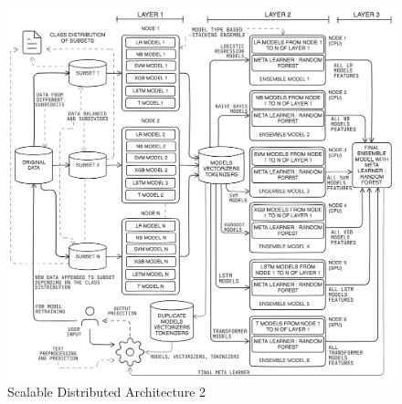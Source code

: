 \begin{figure}[h!]  
    \centering
    \includegraphics[width=1.0\textwidth]{Images/Distributed2.png}  
    \caption{Scalable Distributed Architecture 2}
    \label{lstm archi}  %
\end{figure}

\pagebreak

